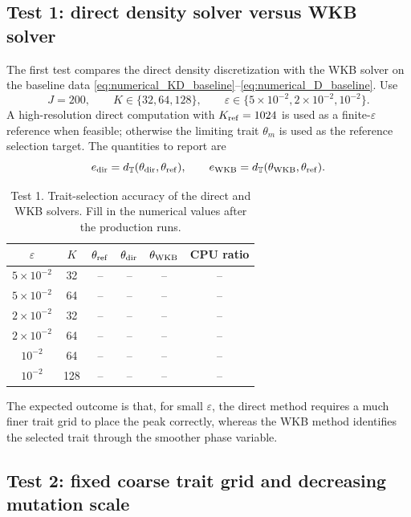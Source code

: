 \documentclass[11pt]{article}
\begin{document}
\subsection{Test 1: direct density solver versus WKB solver}

The first test compares the direct density discretization with the WKB solver
on the baseline data \eqref{eq:numerical_KD_baseline}--\eqref{eq:numerical_D_baseline}.
Use
\[
    J=200,
    \qquad
    K\in\{32,64,128\},
    \qquad
    \varepsilon\in\{5\times10^{-2},2\times10^{-2},10^{-2}\} .
\]
A high-resolution direct computation with \(K_{\rm ref}=1024\) is used as a
finite-\(\varepsilon\) reference when feasible; otherwise the limiting trait
\(\theta_m\) is used as the reference selection target. The quantities to
report are
\[
    e_{\rm dir}=d_{\mathbb T}(\theta_{\rm dir},\theta_{\rm ref}),
    \qquad
    e_{\rm WKB}=d_{\mathbb T}(\theta_{\rm WKB},\theta_{\rm ref}).
\]

\begin{table}[h]
\centering
\caption{Test 1. Trait-selection accuracy of the direct and WKB solvers. Fill
in the numerical values after the production runs.}
\label{tab:test1_trait_accuracy}
\begin{tabular}{cccccc}
\toprule
\(\varepsilon\) & \(K\) & \(\theta_{\rm ref}\) & \(\theta_{\rm dir}\) & \(\theta_{\rm WKB}\) & CPU ratio \\
\midrule
\(5\times10^{-2}\) & 32  & -- & -- & -- & -- \\
\(5\times10^{-2}\) & 64  & -- & -- & -- & -- \\
\(2\times10^{-2}\) & 32  & -- & -- & -- & -- \\
\(2\times10^{-2}\) & 64  & -- & -- & -- & -- \\
\(10^{-2}\)        & 64  & -- & -- & -- & -- \\
\(10^{-2}\)        & 128 & -- & -- & -- & -- \\
\bottomrule
\end{tabular}
\end{table}

The expected outcome is that, for small \(\varepsilon\), the direct method
requires a much finer trait grid to place the peak correctly, whereas the WKB
method identifies the selected trait through the smoother phase variable.

\subsection{Test 2: fixed coarse trait grid and decreasing mutation scale}
\end{document}
